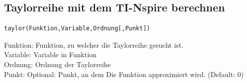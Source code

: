 \subsection{Taylorreihe mit dem TI-Nspire berechnen}
\begin{verbatim}
taylor(Funktion,Variable,Ordnung[,Punkt])
\end{verbatim}
Funktion: Funktion, zu welcher die Taylorreihe gesucht ist. \\
Variable: Variable in Funktion\\
Ordnung: Ordnung der Taylorreihe\\
Punkt: Optional: Punkt, an dem Die Funktion approximiert wird. (Default: 0)
\fi

